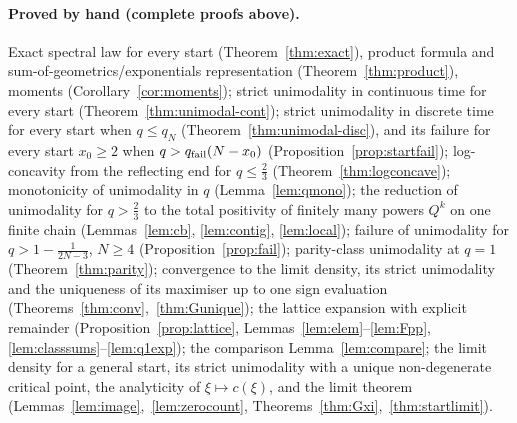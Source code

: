 \documentclass[11pt,a4paper]{article}
\theoremstyle{definition}
\theoremstyle{remark}
\begin{document}
\paragraph{Proved by hand (complete proofs above).}
Exact spectral law for every start (Theorem~\ref{thm:exact}), product formula and sum-of-geometrics/exponentials
representation (Theorem~\ref{thm:product}), moments (Corollary~\ref{cor:moments}); strict unimodality in continuous
time for every start (Theorem~\ref{thm:unimodal-cont}); strict unimodality in discrete time for every start when
$q\le q_N$ (Theorem~\ref{thm:unimodal-disc}), and its failure for every start $x_0\ge2$ when $q>q_{\rm fail}(N-x_0)$
(Proposition~\ref{prop:startfail}); log-concavity from the reflecting end for $q\le\frac23$
(Theorem~\ref{thm:logconcave}); monotonicity of unimodality in $q$ (Lemma~\ref{lem:qmono}); the reduction of
unimodality for $q>\frac23$ to the total positivity of finitely many powers $Q^k$ on one finite chain
(Lemmas~\ref{lem:cb}, \ref{lem:contig}, \ref{lem:local}); failure of unimodality
for $q>1-\frac1{2N-3}$, $N\ge4$ (Proposition~\ref{prop:fail}); parity-class unimodality at $q=1$
(Theorem~\ref{thm:parity}); convergence to the limit density, its strict unimodality and the uniqueness of its
maximiser up to one sign evaluation (Theorems~\ref{thm:conv},~\ref{thm:Gunique}); the lattice expansion with
explicit remainder (Proposition~\ref{prop:lattice}, Lemmas~\ref{lem:elem}--\ref{lem:Fpp},
\ref{lem:classsums}--\ref{lem:q1exp}); the comparison Lemma~\ref{lem:compare}; the limit density for a general
start, its strict unimodality with a unique non-degenerate critical point, the analyticity of $\xi\mapsto c(\xi)$, and
the limit theorem (Lemmas~\ref{lem:image},~\ref{lem:zerocount}, Theorems~\ref{thm:Gxi},~\ref{thm:startlimit}).
\end{document}
